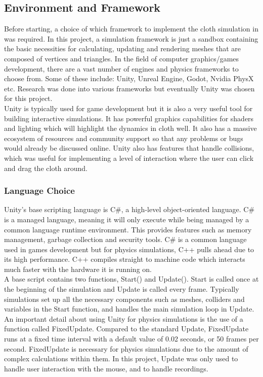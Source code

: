 \documentclass[12pt,a4paper]{article}
\begin{document}
\subsection{Environment and Framework}
Before starting, a choice of which framework to implement the cloth simulation in was required. In this project, a simulation framework is just a sandbox containing the basic necessities for calculating, updating and rendering meshes that are composed of vertices and triangles. In the field of computer graphics/games development, there are a vast number of engines and physics frameworks to choose from. Some of these include: Unity, Unreal Engine, Godot, Nvidia PhysX etc. Research was done into various frameworks but eventually Unity was chosen for this project. \\

Unity is typically used for game development but it is also a very useful tool for building interactive simulations. It has powerful graphics capabilities for shaders and lighting which will highlight the dynamics in cloth well. It also has a massive ecosystem of resources and community support so that any problems or bugs would already be discussed online. Unity also has features that handle collisions, which was useful for implementing a level of interaction where the user can click and drag the cloth around.

\subsubsection{Language Choice}
\label{lang}
Unity's base scripting language is C\#, a high-level object-oriented language. C\# is a managed language, meaning it will only execute while being managed by a common language runtime environment. This provides features such as memory management, garbage collection and security tools. C\# is a common language used in games development but for physics simulations, C++ pulls ahead due to its high performance. C++ compiles straight to machine code which interacts much faster with the hardware it is running on. \\

A base script contains two functions, Start() and Update(). Start is called once at the beginning of the simulation and Update is called every frame. Typically simulations set up all the necessary components such as meshes, colliders and variables in the Start function, and handles the main simulation loop in Update. An important detail about using Unity for physics simulations is the use of a function called FixedUpdate. Compared to the standard Update, FixedUpdate runs at a fixed time interval with a default value of 0.02 seconds, or 50 frames per second. FixedUpdate is necessary for physics simulations due to the amount of complex calculations within them. In this project, Update was only used to handle user interaction with the mouse, and to handle recordings. \\
\end{document}

